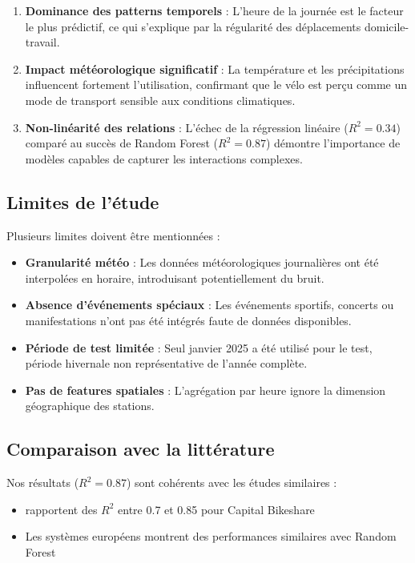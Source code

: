 \documentclass[12pt,a4paper]{article}
\begin{document}
\begin{enumerate}
    \item \textbf{Dominance des patterns temporels} : L'heure de la journée est le facteur le plus prédictif, ce qui s'explique par la régularité des déplacements domicile-travail.
    
    \item \textbf{Impact météorologique significatif} : La température et les précipitations influencent fortement l'utilisation, confirmant que le vélo est perçu comme un mode de transport sensible aux conditions climatiques.
    
    \item \textbf{Non-linéarité des relations} : L'échec de la régression linéaire ($R^2 = 0.34$) comparé au succès de Random Forest ($R^2 = 0.87$) démontre l'importance de modèles capables de capturer les interactions complexes.
\end{enumerate}

\subsection{Limites de l'étude}

Plusieurs limites doivent être mentionnées :

\begin{itemize}
    \item \textbf{Granularité météo} : Les données météorologiques journalières ont été interpolées en horaire, introduisant potentiellement du bruit.
    
    \item \textbf{Absence d'événements spéciaux} : Les événements sportifs, concerts ou manifestations n'ont pas été intégrés faute de données disponibles.
    
    \item \textbf{Période de test limitée} : Seul janvier 2025 a été utilisé pour le test, période hivernale non représentative de l'année complète.
    
    \item \textbf{Pas de features spatiales} : L'agrégation par heure ignore la dimension géographique des stations.
\end{itemize}

\subsection{Comparaison avec la littérature}

Nos résultats ($R^2 = 0.87$) sont cohérents avec les études similaires :
\begin{itemize}
    \item \cite{gebhart2014impact} rapportent des $R^2$ entre 0.7 et 0.85 pour Capital Bikeshare
    \item Les systèmes européens montrent des performances similaires avec Random Forest
\end{itemize}
\end{document}
